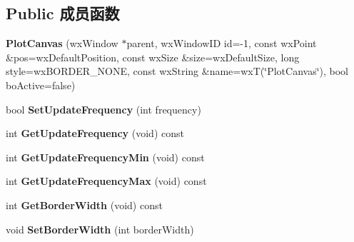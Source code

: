 \subsection*{Public 成员函数}
\begin{DoxyCompactItemize}
\item 
\hypertarget{class_plot_canvas_a2a252e506a73b3f49d278b6911a47232}{{\bfseries Plot\+Canvas} (wx\+Window $\ast$parent, wx\+Window\+I\+D id=-\/1, const wx\+Point \&pos=wx\+Default\+Position, const wx\+Size \&size=wx\+Default\+Size, long style=wx\+B\+O\+R\+D\+E\+R\+\_\+\+N\+O\+N\+E, const wx\+String \&name=wx\+T(\char`\"{}Plot\+Canvas\char`\"{}), bool bo\+Active=false)}\label{class_plot_canvas_a2a252e506a73b3f49d278b6911a47232}

\item 
\hypertarget{class_plot_canvas_a3ab50ba1fb3a311265b3e3274f220b5c}{bool {\bfseries Set\+Update\+Frequency} (int frequency)}\label{class_plot_canvas_a3ab50ba1fb3a311265b3e3274f220b5c}

\item 
\hypertarget{class_plot_canvas_a14e1ee51587c627e11e811eb7866b215}{int {\bfseries Get\+Update\+Frequency} (void) const }\label{class_plot_canvas_a14e1ee51587c627e11e811eb7866b215}

\item 
\hypertarget{class_plot_canvas_aea23c053ab2c95ec81175f4e62b39225}{int {\bfseries Get\+Update\+Frequency\+Min} (void) const }\label{class_plot_canvas_aea23c053ab2c95ec81175f4e62b39225}

\item 
\hypertarget{class_plot_canvas_a3aecbd8bf3461d8651b59e3ff1d4a6e5}{int {\bfseries Get\+Update\+Frequency\+Max} (void) const }\label{class_plot_canvas_a3aecbd8bf3461d8651b59e3ff1d4a6e5}

\item 
\hypertarget{class_plot_canvas_ae6d6dc17298dbdf6155db1d053267cde}{int {\bfseries Get\+Border\+Width} (void) const }\label{class_plot_canvas_ae6d6dc17298dbdf6155db1d053267cde}

\item 
\hypertarget{class_plot_canvas_a15bec8adff88a87e8afeb443ab587a1b}{void {\bfseries Set\+Border\+Width} (int border\+Width)}\label{class_plot_canvas_a15bec8adff88a87e8afeb443ab587a1b}

\end{DoxyCompactItemize}

